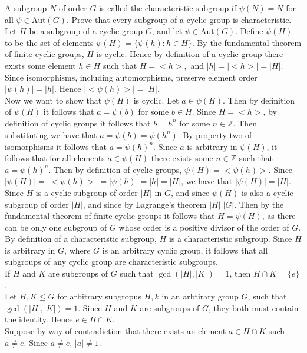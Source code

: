\documentclass{article}
\newcommand{\Aut}{\mbox{Aut}}
\newcommand{\Z}{\mathbb{Z}}
\begin{document}
 A subgroup $N$ of order $G$ is called the characteristic subgroup if $\psi(N) = N$ for all $\psi\in \Aut(G)$. Prove that every subgroup of a cyclic group is characteristic.\\

 Let $H$ be a subgroup of a cyclic group $G$, and let $\psi \in \Aut(G)$. Define $\psi(H)$ to be the set of elements $\psi(H) = \{\psi(h): h\in H\}$. By the fundamental theorem of finite cyclic groups, $H$ is cyclic. Hence by definition of a cyclic group there exists some element $h\in H$ such that $H = <h>,$ and $|h| = |<h>| = |H|$. Since isomorphisms, including automorphisms, preserve element order $|\psi(h)| = |h|$. Hence $|<\psi(h)>| = |H|$.\\
Now we want to show that $\psi(H)$ is cyclic.
Let $a\in \psi(H)$. Then by definition of $\psi(H)$ it follows that $a = \psi(b)$ for some $b\in H$. Since $H = <h>$, by definition of cyclic groups it follows that $b = h^n$ for some $n\in \Z$. Then substituting we have that $a = \psi(b) = \psi(h^n)$. By property two of isomorphisms it follows that $a = \psi(h)^n$. Since $a$ is arbitrary in $\psi(H)$, it follows that for all elements $a\in \psi(H)$ there exists some $n\in \Z$ such that $a = \psi(h)^n$. Then by definition of cyclic groups, $\psi(H) = <\psi(h)>$. Since $|\psi(H)| = |<\psi(h)>| = |\psi(h)| = |h| = |H|$, we have that $|\psi(H)| = |H|.$\\

Since $H$ is a cyclic subgroup of order $|H|$ in $G$, and since $\psi(H)$ is also a cyclic subgroup of order $|H|$, and since by Lagrange's theorem $|H|\big | |G|$. Then by the fundamental theorem of finite cyclic groups it follows that $H = \psi(H)$, as there can be only one subgroup of $G$ whose order is a positive divisor of the order of $G$.\\

By definition of a characteristic subgroup, $H$ is a characteristic subgroup. Since $H$ is arbitrary in $G$, where $G$ is an arbitrary cyclic group, it follows that all subgroups of any cyclic group are characteristic subgroups.
\\

 If $H$ and $K$ are subgroups of $G$ such that $\gcd(|H|,|K|) = 1$, then $H\cap K = \{e\}$.\\
 Let $H,K\le G$ for arbitrary subgropus $H,k$ in an arbtirary group $G$, such that $\gcd(|H|,|K|) = 1$. Since $H$ and $K$ are subgroups of $G$, they both must contain the identity. Hence $e\in H\cap K$.\\
Suppose by way of contradiction that there exists an element $a\in H\cap K$ such $a\ne e$. Since $a\ne e$, $|a| \ne 1$.\\
\end{document}
